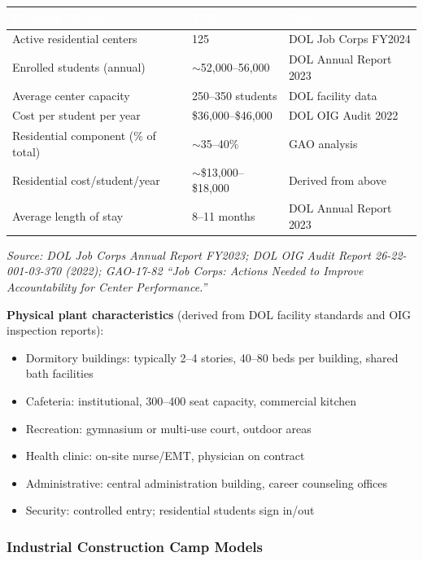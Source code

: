 \documentclass[11pt,letterpaper]{article}
\newcommand{\tableheader}[1]{\textbf{\sffamily\textcolor{white}{#1}}}
\begin{document}
\begin{center}
\begin{tabularx}{\textwidth}{L{4cm}C{3cm}X}
\toprule
{}
\tableheader{Program Parameter} & \tableheader{Value} & \tableheader{Source} \\
\midrule
Active residential centers & 125 & DOL Job Corps FY2024 \\
Enrolled students (annual) & $\sim$52,000--56,000 & DOL Annual Report 2023 \\
Average center capacity & 250--350 students & DOL facility data \\
Cost per student per year & \$36,000--\$46,000 & DOL OIG Audit 2022 \\
Residential component (\% of total) & $\sim$35--40\% & GAO analysis \\
Residential cost/student/year & $\sim$\$13,000--\$18,000 & Derived from above \\
Average length of stay & 8--11 months & DOL Annual Report 2023 \\
\bottomrule
\end{tabularx}
\end{center}

\textit{Source: DOL Job Corps Annual Report FY2023; DOL OIG Audit Report 26-22-001-03-370 (2022); GAO-17-82 ``Job Corps: Actions Needed to Improve Accountability for Center Performance.''}

\textbf{Physical plant characteristics} (derived from DOL facility standards and OIG inspection reports):
\begin{itemize}[leftmargin=1.5em]
  \item Dormitory buildings: typically 2--4 stories, 40--80 beds per building, shared bath facilities
  \item Cafeteria: institutional, 300--400 seat capacity, commercial kitchen
  \item Recreation: gymnasium or multi-use court, outdoor areas
  \item Health clinic: on-site nurse/EMT, physician on contract
  \item Administrative: central administration building, career counseling offices
  \item Security: controlled entry; residential students sign in/out
\end{itemize}

\subsubsection{Industrial Construction Camp Models}
\end{document}
